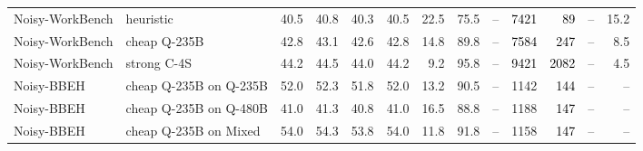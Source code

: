 \begin{longtable}{llrrrrrrrrrrr}
Noisy-WorkBench & heuristic & 40.5 & 40.8 & 40.3 & 40.5 & 22.5 & 75.5 & -- & \textcolor{black}{7421} & \textcolor{black}{89} & -- & 15.2 \\
Noisy-WorkBench & cheap Q-235B & 42.8 & 43.1 & 42.6 & 42.8 & 14.8 & 89.8 & -- & \textcolor{black}{7584} & \textcolor{black}{247} & -- & 8.5 \\
\rowcolor{tracesoft}
Noisy-WorkBench & strong C-4S & 44.2 & 44.5 & 44.0 & 44.2 & 9.2 & 95.8 & -- & \textcolor{black}{9421} & \textcolor{black}{2082} & -- & 4.5 \\
\midrule
Noisy-BBEH & cheap Q-235B on Q-235B & 52.0 & 52.3 & 51.8 & 52.0 & 13.2 & 90.5 & -- & 1142 & \textcolor{black}{144} & -- & -- \\
Noisy-BBEH & cheap Q-235B on Q-480B & 41.0 & 41.3 & 40.8 & 41.0 & 16.5 & 88.8 & -- & 1188 & \textcolor{black}{147} & -- & -- \\
Noisy-BBEH & cheap Q-235B on Mixed & 54.0 & 54.3 & 53.8 & 54.0 & 11.8 & 91.8 & -- & 1158 & \textcolor{black}{147} & -- & -- \\
\end{longtable}
\endgroup

